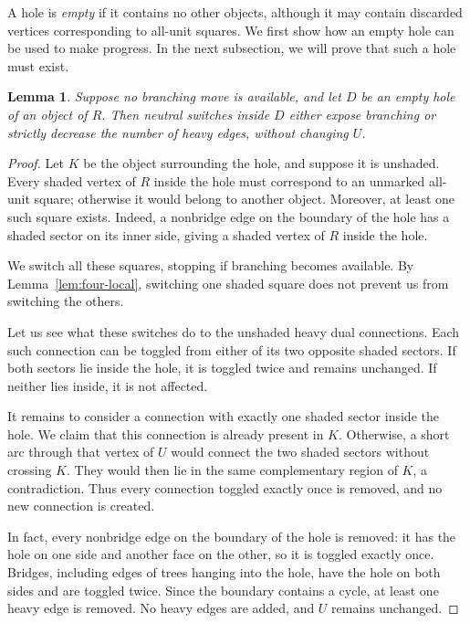 \documentclass[11pt]{article}
\newtheorem{lemma}[theorem]{Lemma}
\theoremstyle{definition}
\theoremstyle{remark}
\begin{document}
A hole is \emph{empty} if it contains no other
objects, although it may contain discarded
vertices corresponding to all-unit squares.
We first show how an empty hole can be used to
make progress. In the next subsection, we will
prove that such a hole must exist.

\begin{lemma}\label{lem:four-empty}
Suppose no branching move is available, and let
$D$ be an empty hole of an object of $R$.
Then neutral switches inside $D$ either expose
branching or strictly decrease the number of
heavy edges, without changing $U$.
\end{lemma}



\begin{proof}
Let $K$ be the object surrounding the hole,
and suppose it is unshaded. Every shaded
vertex of $R$ inside the hole must correspond
to an unmarked all-unit square; otherwise
it would belong to another object.
Moreover, at least one such square exists.
Indeed, a nonbridge edge on the boundary of
the hole has a shaded sector on its inner side,
giving a shaded vertex of $R$ inside the hole.

We switch all these squares, stopping if
branching becomes available. By
Lemma~\ref{lem:four-local}, switching one
shaded square does not prevent us from
switching the others.

Let us see what these switches do to the
unshaded heavy dual connections. Each such
connection can be toggled from either of
its two opposite shaded sectors. If both
sectors lie inside the hole, it is toggled
twice and remains unchanged. If neither
lies inside, it is not affected.

It remains to consider a connection with exactly
one shaded sector inside the hole. We claim that
this connection is already present in $K$.
Otherwise, a short arc through that vertex
of $U$ would connect the two shaded sectors
without crossing $K$. They would then lie
in the same complementary region of $K$,
a contradiction. Thus every connection
toggled exactly once is removed, and no new
connection is created.

In fact, every nonbridge edge on the boundary
of the hole is removed: it has the hole on
one side and another face on the other, so
it is toggled exactly once. Bridges, including
edges of trees hanging into the hole, have
the hole on both sides and are toggled twice.
Since the boundary contains a cycle, at least
one heavy edge is removed. No heavy edges
are added, and $U$ remains unchanged.
\end{proof}
\end{document}
